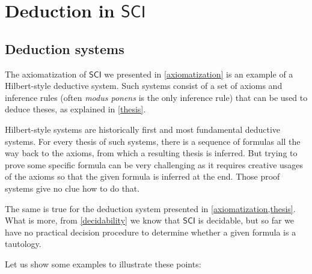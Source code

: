 \documentclass{article}
\theoremstyle{definition}
\theoremstyle{definition}
\newcommand{\SCI}{$\mathsf{SCI}$\xspace}
\begin{document}
\section{Deduction in \SCI}

\subsection{Deduction systems}

The axiomatization of \SCI we presented in \cref{axiomatization} is an example
of a Hilbert-style deductive system. Such systems consist of a set of axioms
and inference rules (often \emph{modus ponens} is the only inference rule) that
can be used to deduce theses, as explained in \cref{thesis}.

Hilbert-style systems are historically first and most fundamental deductive
systems. For every thesis of such systems, there is a sequence of formulas all
the way back to the axioms, from which a resulting thesis is inferred. But
trying to prove some specific formula can be very challenging as it requires
creative usages of the axioms so that the given formula is inferred at the end.
Those proof systems give no clue how to do that.

The same is true for the deduction system presented in
\cref{axiomatization,thesis}. What is more, from \cref{decidability} we know
that \SCI is decidable, but so far we have no practical decision procedure to
determine whether a given formula is a tautology.

Let us show some examples to illustrate these points:
\end{document}
